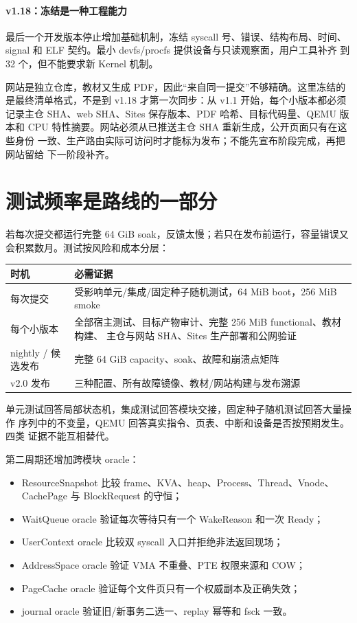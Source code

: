 \paragraph{v1.18：冻结是一种工程能力}

最后一个开发版本停止增加基础机制，冻结 syscall 号、错误、结构布局、时间、
signal 和 ELF 契约。最小 devfs/procfs 提供设备与只读观察面，用户工具补齐
到 32 个，但不能要求新 Kernel 机制。

网站是独立仓库，教材又生成 PDF，因此“来自同一提交”不够精确。这里冻结的
是最终清单格式，不是到 v1.18 才第一次同步：从 v1.1 开始，每个小版本都必须
记录主仓 SHA、web SHA、Sites 保存版本、PDF 哈希、目标代码量、QEMU 版本和
CPU 特性摘要。网站必须从已推送主仓 SHA 重新生成，公开页面只有在这些身份
一致、生产路由实际可访问时才能标为发布；不能先宣布阶段完成，再把网站留给
下一阶段补齐。

\section{测试频率是路线的一部分}

若每次提交都运行完整 64 GiB soak，反馈太慢；若只在发布前运行，容量错误又
会积累数月。测试按风险和成本分层：

\begin{longtable}{L{0.22\textwidth}L{0.60\textwidth}}
\toprule
\textbf{时机} & \textbf{必需证据}\\
\midrule
每次提交 & 受影响单元/集成/固定种子随机测试，64 MiB boot，256 MiB smoke\\
每个小版本 & 全部宿主测试、目标产物审计、完整 256 MiB functional、教材构建、
主仓与网站 SHA、Sites 生产部署和公网验证\\
nightly / 候选发布 & 完整 64 GiB capacity、soak、故障和崩溃点矩阵\\
v2.0 发布 & 三种配置、所有故障镜像、教材/网站构建与发布溯源\\
\bottomrule
\end{longtable}

单元测试回答局部状态机，集成测试回答模块交接，固定种子随机测试回答大量操作
序列中的不变量，QEMU 回答真实指令、页表、中断和设备是否按预期发生。四类
证据不能互相替代。

第二周期还增加跨模块 oracle：

\begin{itemize}
  \item ResourceSnapshot 比较 frame、KVA、heap、Process、Thread、Vnode、
        CachePage 与 BlockRequest 的守恒；
  \item WaitQueue oracle 验证每次等待只有一个 WakeReason 和一次 Ready；
  \item UserContext oracle 比较双 syscall 入口并拒绝非法返回现场；
  \item AddressSpace oracle 验证 VMA 不重叠、PTE 权限来源和 COW；
  \item PageCache oracle 验证每个文件页只有一个权威副本及正确失效；
  \item journal oracle 验证旧/新事务二选一、replay 幂等和 fsck 一致。
\end{itemize}

